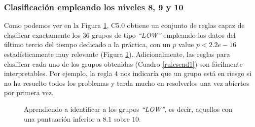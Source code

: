 \subsubsection{Clasificación empleando los niveles 8, 9 y 10}

Como podemos ver en la Figura \ref{fig:cmend1}, C5.0 obtiene un conjunto de reglas capaz de clasificar exactamente los $36$ grupos de tipo \emph{``LOW''} empleando los datos del último tercio del tiempo dedicado a la práctica, con un $p$ value $p < 2.2e-16$ estadísticamente muy relevante (Figura \ref{fig:cmend1}). Adicionalmente, las reglas para clasificar cada uno de los grupos obtenidas (Cuadro \ref{rulesend1}) son fácilmente interpretables. Por ejemplo, la regla $4$ nos indicaría que un grupo está en riesgo si no ha resuelto todos los problemas y tarda mucho en resolverlos una vez abiertos por primera vez.

\begin{figure}[H]
\centering
{}
\caption{Aprendiendo a identificar a los grupos \emph{``LOW''}, es decir, aquellos con una puntuación inferior a $8.1$ sobre $10$.}
\label{fig:cmend1}
\end{figure}


